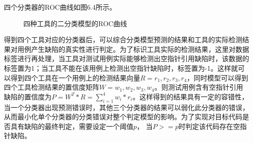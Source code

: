 四个分类器的ROC曲线如图6.4所示。
\begin{figure}[h]
	\label{fig:6-4}
	\centering
	\caption{四种工具的二分类模型的ROC曲线}
\end{figure}


得到四个工具对应的分类器后，可以综合分类模型预测的结果和工具的实际检测结果对用例产生缺陷的真实性进行判定。为了标识工具实际的检测结果，这里对数据标签进行再处理，当工具对测试用例实际能够检测出空指针引用缺陷时，该数据的标签置为1；当工具不能在该用例上检测出空指针缺陷时，标签置为-1。这样就可以得到四个工具在一个用例上的检测结果向量$R={r_1, r_2, r_3, r_4}$，同时模型可以得到四个工具检测结果的置信度矩阵$W={w_1, w_2, w_3, w_4}$。则测试用例含有空指针引用缺陷的置信度为$P = W^T*R = \sum_{i=1}^4 w_i*r_i$。这样得到的结果具有一定的容错性，当一个分类器出现预测错误时，其他三个分类器的结果可以弱化此分类器的错误，从而最小化单个分类器的分类错误对整个判定模型的影响。为了实现对目标代码是否具有缺陷的最终判定，需要设定一个阈值$p$， 当$P>=p$时判定该代码存在空指针缺陷。

